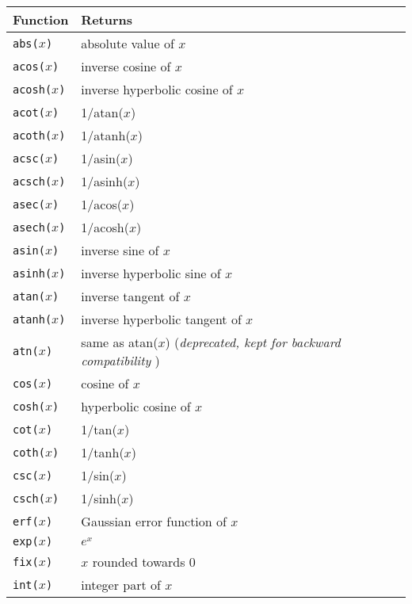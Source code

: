 \begin{supertabular}{ll} \hline
Function & Returns  \\ \hline
{\tt abs($x$)}          	& absolute value of $x$ \\
{\tt acos($x$)}        	& inverse cosine of $x$ \\
{\tt acosh($x$)}      	& inverse hyperbolic cosine of $x$ \\
{\tt acot($x$)}        	& 1/atan($x$) \\
{\tt acoth($x$)}      	& 1/atanh($x$) \\
{\tt acsc($x$)} 	     	& 1/asin($x$) \\
{\tt acsch($x$)}      	& 1/asinh($x$) \\
{\tt asec($x$)}        	& 1/acos($x$) \\
{\tt asech($x$)}      	& 1/acosh($x$) \\
{\tt asin($x$)}        	& inverse sine of $x$ \\
{\tt asinh($x$)}      	& inverse hyperbolic sine of $x$\\
{\tt atan($x$)}        	& inverse tangent of $x$ \\
{\tt atanh($x$)}      	& inverse hyperbolic tangent of $x$ \\
{\tt atn($x$)}          	& same as atan($x$) ({\it deprecated, kept for backward compatibility} ) \\
{\tt cos($x$)}          	& cosine of $x$ \\
{\tt cosh($x$)}        	& hyperbolic cosine of $x$ \\
{\tt cot($x$)}          	& 1/tan($x$) \\
{\tt coth($x$)}        	& 1/tanh($x$) \\
{\tt csc($x$)}             & 1/sin($x$) \\
{\tt csch($x$)}        	& 1/sinh($x$) \\
{\tt erf($x$)}          	& Gaussian error function of $x$ \\
{\tt exp($x$)}          	& $e^x$  \\
{\tt fix($x$)}          	& $x$ rounded towards 0 \\
{\tt int($x$)}          	& integer part of $x$ \\

\end{supertabular}
